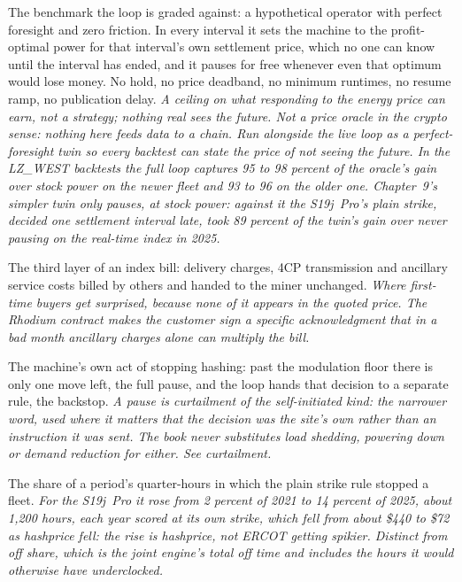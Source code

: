 \begin{description}[leftmargin=0pt,style=unboxed,itemsep=0.35em,parsep=0.15em]
\item[oracle (perfect-foresight twin)] \hypertarget{glossary:oracle}{}The benchmark the loop is graded against: a hypothetical operator with perfect foresight and zero friction. In every interval it sets the machine to the profit-optimal power for that interval's own settlement price, which no one can know until the interval has ended, and it pauses for free whenever even that optimum would lose money. No hold, no price deadband, no minimum runtimes, no resume ramp, no publication delay. \emph{A ceiling on what responding to the energy price can earn, not a strategy; nothing real sees the future. Not a price oracle in the crypto sense: nothing here feeds data to a chain. Run alongside the live loop as a perfect-foresight twin so every backtest can state the price of not seeing the future. In the LZ\_WEST backtests the full loop captures 95 to 98 percent of the oracle's gain over stock power on the newer fleet and 93 to 96 on the older one. Chapter~9's simpler twin only pauses, at stock power: against it the S19j~Pro's plain strike, decided one settlement interval late, took 89 percent of the twin's gain over never pausing on the real-time index in 2025.}
\item[pass-through] \hypertarget{glossary:pass-through}{}The third layer of an index bill: delivery charges, 4CP transmission and ancillary service costs billed by others and handed to the miner unchanged. \emph{Where first-time buyers get surprised, because none of it appears in the quoted price. The Rhodium contract makes the customer sign a specific acknowledgment that in a bad month ancillary charges alone can multiply the bill.}
\item[pause] \hypertarget{glossary:pause}{}The machine's own act of stopping hashing: past the modulation floor there is only one move left, the full pause, and the loop hands that decision to a separate rule, the backstop. \emph{A pause is curtailment of the self-initiated kind: the narrower word, used where it matters that the decision was the site's own rather than an instruction it was sent. The book never substitutes load shedding, powering down or demand reduction for either. See curtailment.}
\item[pause share] \hypertarget{glossary:pause-share}{}The share of a period's quarter-hours in which the plain strike rule stopped a fleet. \emph{For the S19j~Pro it rose from 2 percent of 2021 to 14 percent of 2025, about 1,200 hours, each year scored at its own strike, which fell from about \$440 to \$72 as hashprice fell: the rise is hashprice, not ERCOT getting spikier. Distinct from off share, which is the joint engine's total off time and includes the hours it would otherwise have underclocked.}

\end{description}
